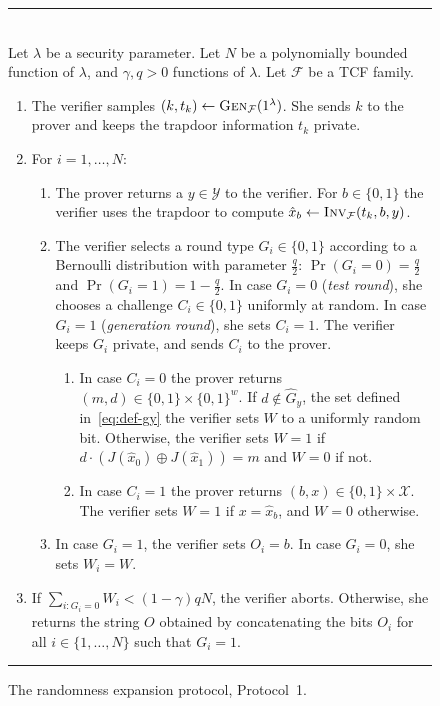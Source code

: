 \documentclass[11pt]{article}
\theoremstyle{remark}
\theoremstyle{definition}
\newcommand{\mF}{\ensuremath{\mathcal{F}}}
\newcommand{\mX}{\ensuremath{\mathcal{X}}}
\newcommand{\mY}{\ensuremath{\mathcal{Y}}}
\newcommand{\Inv}{\ensuremath{\textsc{Inv}}}
\newcommand{\dset}{G}
\newcommand{\Gen}{\textsc{Gen}}
\newcommand{\inj}{J}
\begin{document}
\begin{figure}[htbp]
\rule[1ex]{16.5cm}{0.5pt}\\
Let $\lambda$ be a security parameter. Let $N$ be a polynomially bounded function of $\lambda$, and $\gamma,q>0$ functions of $\lambda$. Let $\mF$ be a TCF family.
\begin{enumerate}
\item The verifier samples $(k,t_k)\leftarrow \Gen_\mF(1^\lambda)$. She sends $k$ to the prover and keeps the trapdoor information $t_k$ private. 
\item For $i=1,\ldots,N$:
\begin{enumerate}
\item The prover returns a  $y \in \mY$ to the verifier. For $b\in\{0,1\}$ the verifier uses the trapdoor to compute $\hat{x}_b\leftarrow \Inv_\mF(t_k,b,y)$. 
\item The verifier selects a round type $G_i \in \{0,1\}$ according to a Bernoulli  distribution with parameter $\frac{q}{2}$: $\Pr(G_i=0)=\frac{q}{2}$ and $\Pr(G_i=1)=1-\frac{q}{2}$. In case $G_i=0$ (\emph{test round}), she chooses a challenge $C_i\in \{0,1\}$ uniformly at random. In case $G_i=1$ (\emph{generation round}), she sets $C_i=1$. The verifier keeps $G_i$ private, and sends $C_i$ to the prover. 
\begin{enumerate}
\item In case $C_i=0$ the prover returns $(m,d)\in\{0,1\}\times \{0,1\}^w$. If $d\notin \hat{\dset}_y$, the set defined in~\eqref{eq:def-gy} the verifier sets $W$ to a uniformly random bit. Otherwise, the verifier sets $W=1$ if $d\cdot (\inj(\hat{x}_0)\oplus \inj(\hat{x}_1)) = m$ and $W=0$ if not.
\item In case $C_i=1$ the prover returns $(b,x)\in\{0,1\}\times \mX$. The verifier sets $W=1$ if $x = \hat{x}_b$, and $W=0$ otherwise. 
\end{enumerate}
\item In case $G_i=1$, the verifier sets $O_i = b$. In case $G_i=0$, she sets $W_i = W$. 
\end{enumerate}
\item If $\sum_{i: G_i=0} W_i < (1-\gamma)qN$, the verifier aborts. Otherwise, she returns the string $O$ obtained by concatenating the bits $O_i$ for all $i\in\{1,\ldots,N\}$ such that $G_i=1$. 
\end{enumerate}
\rule[1ex]{16.5cm}{0.5pt}
\caption{The randomness expansion protocol, Protocol~1.}
\label{fig:protocol}
\end{figure}
\end{document}
